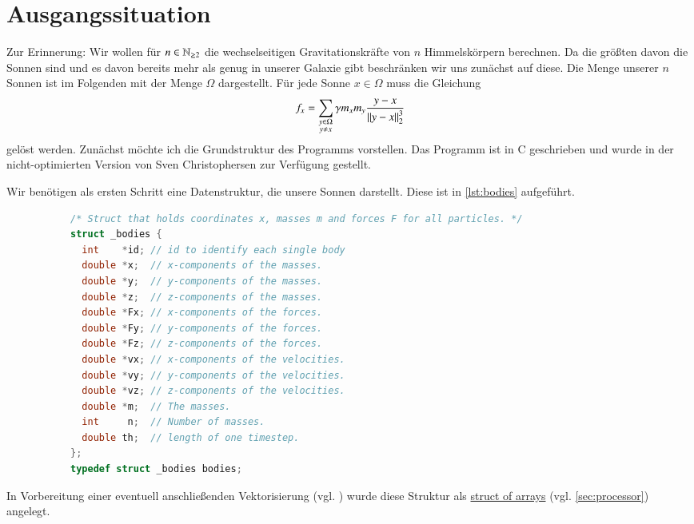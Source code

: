   \section{Ausgangssituation}
   \label{sec:ausgang}
    Zur Erinnerung: Wir wollen für $n \in \mathbb{N}_{\geq 2}$ die wechselseitigen Gravitationskräfte von $n$ Himmelskörpern berechnen. Da die größten davon die Sonnen sind und es davon bereits mehr als
    genug in unserer Galaxie gibt beschränken wir uns zunächst auf diese. Die Menge unserer $n$ Sonnen ist im Folgenden mit der Menge $\Omega$ dargestellt. Für jede Sonne
    $x \in \Omega$ muss die Gleichung
    \begin{equation}
      f_x = \sum_{\substack{y \in \Omega \\ y \neq x}} \gamma m_x  m_y \frac{y - x}{\left\lVert y - x\right\rVert^3_2}
      \label{eq:sum_grav2}
    \end{equation}
    gelöst werden. Zunächst möchte ich die Grundstruktur des Programms vorstellen. Das Programm ist in C geschrieben und wurde in der nicht-optimierten Version von Sven 
    Christophersen zur Verfügung gestellt.
    
    Wir benötigen als ersten Schritt eine Datenstruktur, die unsere Sonnen darstellt. Diese ist in \autoref{lst:bodies} aufgeführt.
    \begin{figure}[tb]
    \centering
    \begin{subfigure}{0.9 \textwidth}
    \begin{lstlisting}[language=C, label=lst:bodies, caption={Die Struktur \code{bodies} dient der Speicherung aller mit den einzelnen Sonnen zusammenhängenden Daten}, numbers=none]
/* Struct that holds coordinates x, masses m and forces F for all particles. */
struct _bodies {
  int    *id; // id to identify each single body
  double *x;  // x-components of the masses.
  double *y;  // y-components of the masses.
  double *z;  // z-components of the masses.
  double *Fx; // x-components of the forces.
  double *Fy; // y-components of the forces.
  double *Fz; // z-components of the forces.
  double *vx; // x-components of the velocities.
  double *vy; // y-components of the velocities.
  double *vz; // z-components of the velocities.
  double *m;  // The masses.
  int     n;  // Number of masses.
  double th;  // length of one timestep.
};
typedef struct _bodies bodies;
    \end{lstlisting}
    \end{subfigure}
    \end{figure}
    In Vorbereitung einer eventuell anschließenden Vektorisierung (vgl. ) wurde diese Struktur als \hyperref[w:aos]{struct of arrays} (vgl. \autoref{sec:processor}) 
    angelegt.
    
